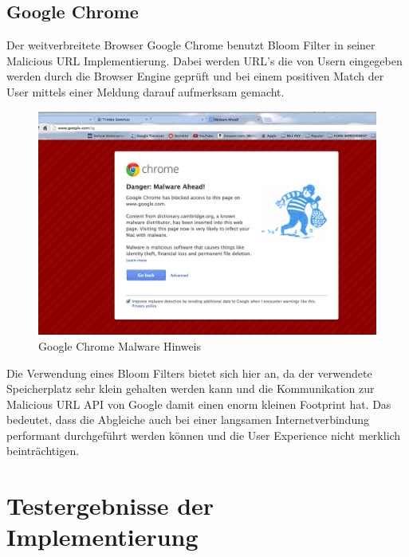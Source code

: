 \documentclass[12pt,a4paper]{report}
\begin{document}
\section{Google Chrome}\label{sec:google-chrome}
Der weitverbreitete Browser Google Chrome benutzt Bloom Filter in seiner Malicious URL Implementierung. Dabei werden URL's die von Usern eingegeben werden durch die Browser Engine geprüft und bei einem positiven Match der User mittels einer Meldung darauf aufmerksam gemacht.

    \begin{figure}[h!]
    \includegraphics[width=\textwidth]{assets/google_malware.png}
    \caption{Google Chrome Malware Hinweis}
      \label{fig:google-chrome-malware}
    \end{figure}
    
Die Verwendung eines Bloom Filters bietet sich hier an, da der verwendete Speicherplatz sehr klein gehalten werden kann und die Kommunikation zur Malicious URL API von Google damit einen enorm kleinen Footprint hat. Das bedeutet, dass die Abgleiche auch bei einer langsamen Internetverbindung performant durchgeführt werden können und die User Experience nicht merklich beinträchtigen.

%


\chapter{Testergebnisse der Implementierung}\label{ch:testergebnisse-der-implementierung}
\end{document}
